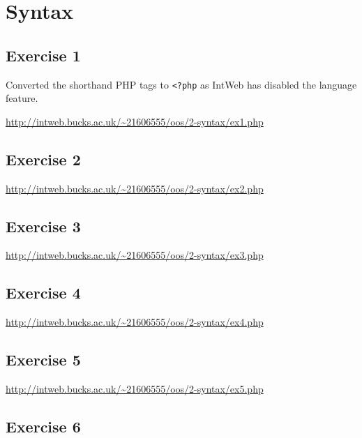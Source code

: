 \chapter{Syntax}

\section{Exercise 1}

Converted the shorthand PHP tags to \texttt{<?php} as IntWeb has disabled the language feature.

\url{http://intweb.bucks.ac.uk/~21606555/oos/2-syntax/ex1.php}

\captionsetup{type=figure}

\section{Exercise 2}

\url{http://intweb.bucks.ac.uk/~21606555/oos/2-syntax/ex2.php}

\captionsetup{type=figure}

\section{Exercise 3}

\url{http://intweb.bucks.ac.uk/~21606555/oos/2-syntax/ex3.php}

\captionsetup{type=figure}

\section{Exercise 4}

\url{http://intweb.bucks.ac.uk/~21606555/oos/2-syntax/ex4.php}

\captionsetup{type=figure}

\section{Exercise 5}

\url{http://intweb.bucks.ac.uk/~21606555/oos/2-syntax/ex5.php}

\captionsetup{type=figure}

\section{Exercise 6}

